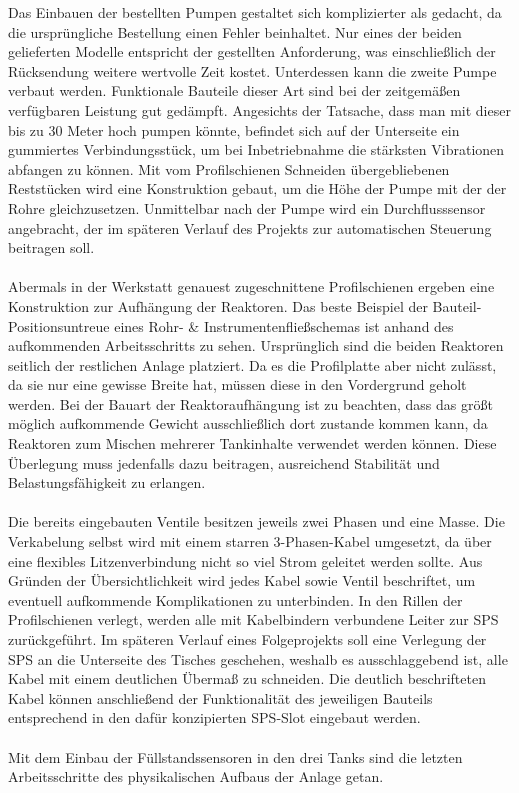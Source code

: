 	Das Einbauen der bestellten Pumpen gestaltet sich komplizierter als gedacht, da die ursprüngliche Bestellung einen Fehler beinhaltet. Nur eines der beiden gelieferten Modelle entspricht der gestellten Anforderung, was einschließlich der Rücksendung weitere wertvolle Zeit kostet. Unterdessen kann die zweite Pumpe verbaut werden. Funktionale Bauteile dieser Art sind bei der zeitgemäßen verfügbaren Leistung gut gedämpft. Angesichts der Tatsache, dass man mit dieser bis zu 30 Meter hoch pumpen könnte, befindet sich auf der Unterseite ein gummiertes Verbindungsstück, um bei Inbetriebnahme die stärksten Vibrationen abfangen zu können. Mit vom Profilschienen Schneiden übergebliebenen Reststücken wird eine Konstruktion gebaut, um die Höhe der Pumpe mit der der Rohre gleichzusetzen. Unmittelbar nach der Pumpe wird ein Durchflusssensor angebracht, der im späteren Verlauf des Projekts zur automatischen Steuerung beitragen soll.\\\\
	Abermals in der Werkstatt genauest zugeschnittene Profilschienen ergeben eine Konstruktion zur Aufhängung der Reaktoren. Das beste Beispiel der Bauteil-Positionsuntreue eines Rohr- \& Instrumentenfließschemas ist anhand des aufkommenden Arbeitsschritts zu sehen. Ursprünglich sind die beiden Reaktoren seitlich der restlichen Anlage platziert. Da es die Profilplatte aber nicht zulässt, da sie nur eine gewisse Breite hat, müssen diese in den Vordergrund geholt werden. Bei der Bauart der Reaktoraufhängung ist zu beachten, dass das größt möglich aufkommende Gewicht ausschließlich dort zustande kommen kann, da Reaktoren zum Mischen mehrerer Tankinhalte verwendet werden können. Diese Überlegung muss jedenfalls dazu beitragen, ausreichend Stabilität und Belastungsfähigkeit zu erlangen.\\\\
	Die bereits eingebauten Ventile besitzen jeweils zwei Phasen und eine Masse. Die Verkabelung selbst wird mit einem starren 3-Phasen-Kabel umgesetzt, da über eine flexibles Litzenverbindung nicht so viel Strom geleitet   werden sollte. Aus Gründen der Übersichtlichkeit wird jedes Kabel sowie Ventil beschriftet, um eventuell aufkommende Komplikationen zu unterbinden. In den Rillen der Profilschienen verlegt, werden alle mit Kabelbindern verbundene Leiter zur SPS zurückgeführt. Im späteren Verlauf eines Folgeprojekts soll eine Verlegung der SPS an die Unterseite des Tisches geschehen, weshalb es ausschlaggebend ist, alle Kabel mit einem deutlichen Übermaß zu schneiden. Die deutlich beschrifteten Kabel können anschließend der Funktionalität des jeweiligen Bauteils entsprechend in den dafür konzipierten SPS-Slot eingebaut werden.\\\\
	Mit dem Einbau der Füllstandssensoren in den drei Tanks sind die letzten Arbeitsschritte des physikalischen Aufbaus der Anlage getan.

